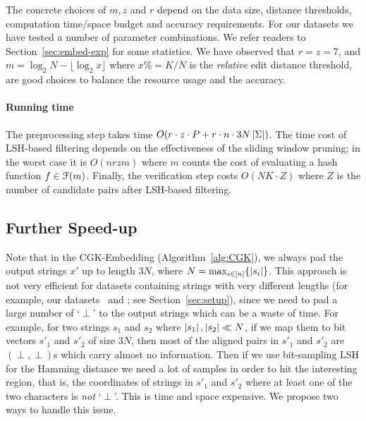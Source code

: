 The concrete choices of $m, z$ and $r$ depend on the data size, distance thresholds, computation time/space budget and accuracy requirements.  For our datasets we have tested a number of parameter combinations.  We refer readers to Section~\ref{sec:embed-exp} for some statistics.
We have observed that $r = z = 7$, and $m = \log_2 N - \lfloor \log_2 x \rfloor$ where $x \% = K/N$ is the {\em relative} edit distance threshold, are good choices to balance the resource usage and the accuracy.

\paragraph{Running time}  The preprocessing step takes time $O(r \cdot z \cdot P + r \cdot n \cdot 3N \left| \Sigma \right|)$.  The time cost of LSH-based filtering depends on the effectiveness of the sliding window pruning; in the worst case it is $O(n r z m)$ where $m$ counts the cost of evaluating a hash function $f \in \mathcal{F}(m)$. Finally, the verification step costs $O(N K \cdot Z)$ where $Z$ is the number of candidate pairs after LSH-based filtering.


\subsection{Further Speed-up}
\label{sec:speedup}

Note that in the CGK-Embedding (Algorithm~\ref{alg:CGK}), we always pad the output strings $x'$ up to length $3N$, where $N = \max_{i \in [n]} \{\left| s_i \right|\}$.  This approach is not very efficient for datasets containing strings with very different lengths (for example, our datasets \uniref\ and \trec; see Section~\ref{sec:setup}), since we need to pad a large number of `$\perp$' to the output strings which can be a waste of time. For example, for two strings $s_1$ and $s_2$ where $\left| s_1 \right|, \left| s_2 \right| \ll N$, if we map them to bit vectors $s'_1$ and $s'_2$ of size $3N$, then most of the aligned pairs in $s'_1$ and $s'_2$ are $(\perp, \perp)$s which carry almost no information.  Then if we use bit-sampling LSH for the Hamming distance we need a lot of samples in order to hit the interesting region, that is, the coordinates of strings in $s'_1$ and $s'_2$ where at least one of the two characters is {\em not} `$\perp$'.  
This is time and space expensive. 
We propose two ways to handle this issue. 

